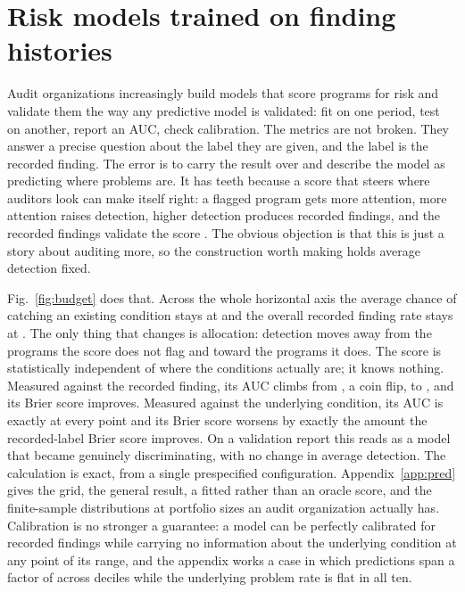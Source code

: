 \section{Risk models trained on finding histories}\label{sec:scoring}

Audit organizations increasingly build models that score programs for risk and
validate them the way any predictive model is validated: fit on one period,
test on another, report an AUC, check calibration. The metrics are not broken.
They answer a precise question about the label they are given, and the label
is the recorded finding. The error is to carry the result over and describe
the model as predicting where problems are. It has teeth because a score that
steers where auditors look can make itself right: a flagged program gets more
attention, more attention raises detection, higher detection produces recorded
findings, and the recorded findings validate the score
\citep{ensign2018,lum2016,lakkaraju2017,kleinberg2018}. The obvious objection
is that this is just a story about auditing more, so the construction worth
making holds average detection fixed.

Fig.~\ref{fig:budget} does that. Across the whole horizontal axis the
average chance of catching an existing condition stays at
\mBudgetDetection{} and the overall recorded finding rate stays at
\mBudgetPrevalence{}. The only thing that changes is allocation: detection
moves away from the programs the score does not flag and toward the programs
it does. The score is statistically independent of where the conditions
actually are; it knows nothing. Measured against the recorded finding, its
AUC climbs from \mBudgetAucFstart{}, a coin flip, to \mBudgetAucFend{}, and
its Brier score improves. Measured against the underlying condition, its AUC
is exactly \mBudgetAucC{} at every point and its Brier score worsens by exactly
the amount the recorded-label Brier score improves.
On a validation report this reads as a model that became genuinely
discriminating, with no change in average detection. The calculation is
exact, from a single prespecified configuration.
Appendix~\ref{app:pred} gives the grid, the general result, a fitted rather
than an oracle score, and the finite-sample distributions at portfolio sizes
an audit organization actually has. Calibration is no stronger a guarantee: a
model can be perfectly calibrated for recorded findings while carrying no
information about the underlying condition at any point of its range, and the
appendix works a case in which predictions span a factor of \nCalibSpan{}
across deciles while the underlying problem rate is flat in all ten.

